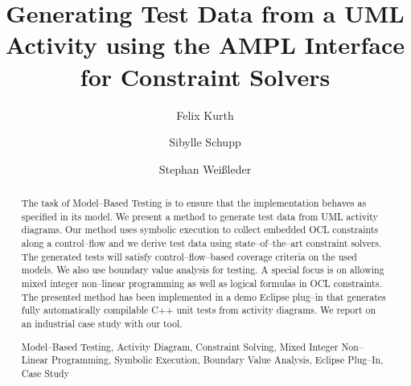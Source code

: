 \documentclass[runningheads,a4paper]{llncs}%
\newcommand{\keywords}[1]{\par\addvspace\baselineskip%
\noindent\keywordname\enspace\ignorespaces#1}%
\begin{document}
%
%
\mainmatter  %
%
\title{Generating Test Data from a UML Activity using the AMPL Interface for Constraint Solvers}%
%
%
%
%
%
\author{Felix Kurth%
\and Sibylle Schupp%
%
\and Stephan Wei{\ss}leder}%
%
%
%
%
%
%
%
\maketitle%
%
\begin{abstract}%
The task of Model--Based Testing is to ensure that the implementation behaves as specified in its model. We present a method to generate test data from UML activity diagrams. Our method uses symbolic execution to collect embedded OCL constraints along a control--flow and we derive test data using state--of--the--art constraint solvers. The generated tests will satisfy control--flow--based coverage criteria on the used models. We also use boundary value analysis for testing. A special focus is on allowing mixed integer non--linear programming as well as logical formulas in OCL constraints. The presented method has been implemented in a demo Eclipse plug--in that generates fully automatically compilable C++ unit tests from activity diagrams. We report on an industrial case study with our tool.%
\keywords{Model--Based Testing, Activity Diagram, Constraint Solving, Mixed Integer Non--Linear Programming, Symbolic Execution, Boundary Value Analysis, Eclipse Plug--In, Case Study}%
\end{abstract}%
\end{document}
